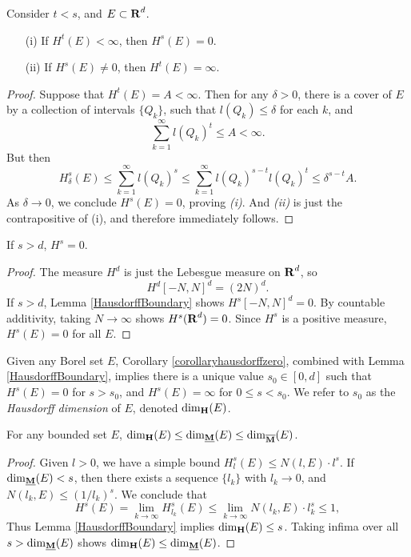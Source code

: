 \begin{lemma} \label{HausdorffBoundary}
	Consider $t < s$, and $E \subset \operatorname{\mathbf{R}}^d$.
	\begin{enumerate}
		\item[(i)] If $H^t(E) < \infty$, then $H^s(E) = 0$.
		\item[(ii)] If $H^s(E) \neq 0$, then $H^t(E) = \infty$.
	\end{enumerate}
\end{lemma}
\begin{proof}
	Suppose that $H^t(E) = A < \infty$. Then for any $\delta > 0$, there is a cover of $E$ by a collection of intervals $\{ Q_k \}$, such that $l(Q_k) \leq \delta$ for each $k$, and
	\[ \sum_{k = 1}^\infty l(Q_k)^t \leq A < \infty. \]
	But then
	\[ H^s_\delta(E) \leq \sum_{k = 1}^\infty l(Q_k)^s \leq \sum_{k = 1}^\infty l(Q_k)^{s-t} l(Q_k)^t \leq \delta^{s-t} A. \]
	As $\delta \to 0$, we conclude $H^s(E) = 0$, proving \emph{(i)}. And \emph{(ii)} is just the contrapositive of (i), and therefore immediately follows.
\end{proof}

\begin{corollary} \label{corollaryhausdorffzero}
	If $s > d$, $H^s = 0$.
\end{corollary}
\begin{proof}
	The measure $H^d$ is just the Lebesgue measure on $\operatorname{\mathbf{R}}^d$, so
	\[ H^d[-N,N]^d = (2N)^d. \]
	If $s > d$, Lemma \ref{HausdorffBoundary} shows $H^s[-N,N]^d = 0$. By countable additivity, taking $N \to \infty$ shows $H^s(\operatorname{\mathbf{R}}^d) = 0$. Since $H^s$ is a positive measure, $H^s(E) = 0$ for all $E$.
\end{proof}

Given any Borel set $E$, Corollary \ref{corollaryhausdorffzero}, combined with Lemma \ref{HausdorffBoundary}, implies there is a unique value $s_0 \in [0,d]$ such that $H^s(E) = 0$ for $s > s_0$, and $H^s(E) = \infty$ for $0 \leq s < s_0$. We refer to $s_0$ as the \emph{Hausdorff dimension} of $E$, denoted $\operatorname{\dim_{\mathbf{H}}}(E)$.

\begin{theorem}
	For any bounded set $E$, $\operatorname{\dim_{\mathbf{H}}}(E) \leq \operatorname{\dim_{\underline{\mathbf{M}}}}(E) \leq \operatorname{\dim_{\overline{\mathbf{M}}}}(E)$.
\end{theorem}
\begin{proof}
	Given $l > 0$, we have a simple bound $H^s_l(E) \leq N(l,E) \cdot l^s$. If $\operatorname{\dim_{\underline{\mathbf{M}}}}(E) < s$, then there exists a sequence $\{ l_k \}$ with $l_k \to 0$, and $N(l_k,E) \leq (1/l_k)^s$. We conclude that
	\[ H^s(E) = \lim_{k \to \infty} H^s_{l_k}(E) \leq \lim_{k \to \infty} N(l_k,E) \cdot l_k^s \leq 1, \]
	Thus Lemma \ref{HausdorffBoundary} implies $\operatorname{\dim_{\mathbf{H}}}(E) \leq s$. Taking infima over all $s > \operatorname{\dim_{\underline{\mathbf{M}}}}(E)$ shows $\operatorname{\dim_{\mathbf{H}}}(E) \leq \operatorname{\dim_{\underline{\mathbf{M}}}}(E)$.
\end{proof}

